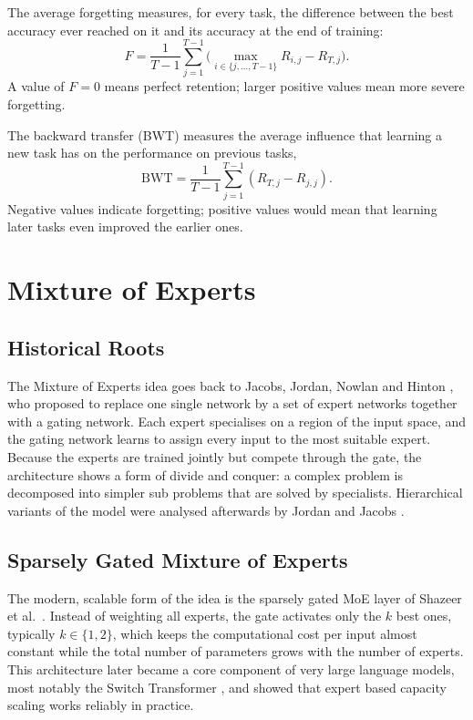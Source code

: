 The average forgetting measures, for every task, the difference between the
best accuracy ever reached on it and its accuracy at the end of training:
\begin{equation}
  F = \frac{1}{T-1} \sum_{j=1}^{T-1}
      \Big( \max_{i \in \{j, \dots, T-1\}} R_{i,j} - R_{T,j} \Big).
  \label{eq:forgetting}
\end{equation}
A value of $F = 0$ means perfect retention; larger positive values mean
more severe forgetting.

The backward transfer (BWT) measures the average influence that learning a
new task has on the performance on previous tasks,
\begin{equation}
  \mathrm{BWT} = \frac{1}{T-1} \sum_{j=1}^{T-1} \left( R_{T,j} - R_{j,j} \right).
  \label{eq:bwt}
\end{equation}
Negative values indicate forgetting; positive values would mean that
learning later tasks even improved the earlier ones.

\section{Mixture of Experts}
\label{sec:moe}

\subsection{Historical Roots}

The Mixture of Experts idea goes back to Jacobs, Jordan, Nowlan and
Hinton \cite{jacobs1991}, who proposed to replace one single network by a
set of expert networks together with a gating network. Each expert
specialises on a region of the input space, and the gating network learns
to assign every input to the most suitable expert. Because the experts are
trained jointly but compete through the gate, the architecture shows a
form of divide and conquer: a complex problem is decomposed into simpler
sub problems that are solved by specialists. Hierarchical variants of the
model were analysed afterwards by Jordan and Jacobs \cite{jordan1994}.

\subsection{Sparsely Gated Mixture of Experts}
\label{sec:sparsemoe}

The modern, scalable form of the idea is the sparsely gated MoE layer of
Shazeer et al.\ \cite{shazeer2017}. Instead of weighting all experts, the
gate activates only the $k$ best ones, typically $k \in \{1, 2\}$, which
keeps the computational cost per input almost constant while the total
number of parameters grows with the number of experts. This architecture
later became a core component of very large language models, most notably
the Switch Transformer \cite{fedus2022}, and showed that expert based
capacity scaling works reliably in practice.

